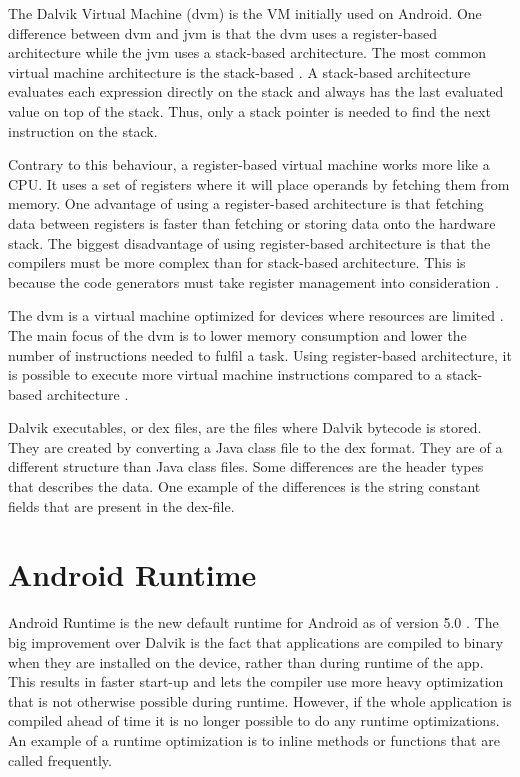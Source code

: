 The Dalvik Virtual Machine (\gls{dvm}) is the VM initially used on Android. One difference between \gls{dvm} and \gls{jvm} is that the \gls{dvm} uses a register-based architecture while the \gls{jvm} uses a stack-based architecture. The most common virtual machine architecture is the stack-based \cite[p.~158]{craig2010virtual}. A stack-based architecture evaluates each expression directly on the stack and always has the last evaluated value on top of the stack. Thus, only a stack pointer is needed to find the next instruction on the stack.

Contrary to this behaviour, a register-based virtual machine works more like a CPU. It uses a set of registers where it will place operands by fetching them from memory. One advantage of using a register-based architecture is that fetching data between registers is faster than fetching or storing data onto the hardware stack. The biggest disadvantage of using register-based architecture is that the compilers must be more complex than for stack-based architecture. This is because the code generators must take register management into consideration \cite[p.~159-160]{craig2010virtual}.

The \gls{dvm} is a virtual machine optimized for devices where resources are limited \cite{android:dalvik:internals}. The main focus of the \gls{dvm} is to lower memory consumption and lower the number of instructions needed to fulfil a task. Using register-based architecture, it is possible to execute more virtual machine instructions compared to a stack-based architecture \cite{shi2008virtual}. 


Dalvik executables, or \gls{dex} files, are the files where Dalvik bytecode is stored. They are created by converting a Java class file to the \gls{dex} format. They are of a different structure than Java class files. Some differences are the header types that describes the data. One example of the differences is the string constant fields that are present in the \gls{dex}-file. %

\section{Android Runtime}
Android Runtime is the new default runtime for Android as of version 5.0 \cite{android:dalvik}. The big improvement over Dalvik is the fact that applications are compiled to binary when they are installed on the device, rather than during runtime of the app. This results in faster start-up \cite{li2016advanced} and lets the compiler use more heavy optimization that is not otherwise possible during runtime. However, if the whole application is compiled ahead of time it is no longer possible to do any runtime optimizations. An example of a runtime optimization is to inline methods or functions that are called frequently.

